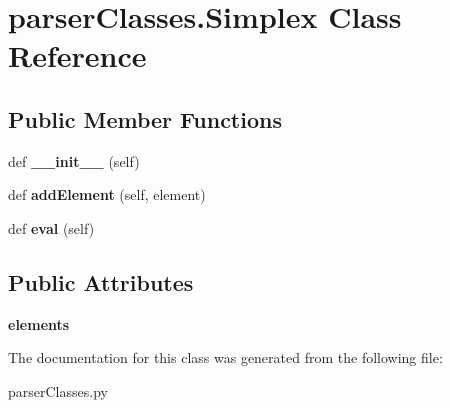 \hypertarget{classparser_classes_1_1_simplex}{}\section{parser\+Classes.\+Simplex Class Reference}
\label{classparser_classes_1_1_simplex}
\subsection*{Public Member Functions}
\begin{DoxyCompactItemize}
\item 
\mbox{\label{classparser_classes_1_1_simplex_ae0d244c9cd73a6ccb9fe38a5e2045818}} 
def {\bfseries \+\_\+\+\_\+init\+\_\+\+\_\+} (self)
\item 
\mbox{\label{classparser_classes_1_1_simplex_ab4f047be45ac43f11b9fb18691ca1413}} 
def {\bfseries add\+Element} (self, element)
\item 
\mbox{\label{classparser_classes_1_1_simplex_adbbb7c22025953fc0690e4bcd22ce4cc}} 
def {\bfseries eval} (self)
\end{DoxyCompactItemize}
\subsection*{Public Attributes}
\begin{DoxyCompactItemize}
\item 
\mbox{\label{classparser_classes_1_1_simplex_a20765598c2e5bc570cc0ea135920d4ea}} 
{\bfseries elements}
\end{DoxyCompactItemize}


The documentation for this class was generated from the following file\+:\begin{DoxyCompactItemize}
\item 
parser\+Classes.\+py\end{DoxyCompactItemize}
